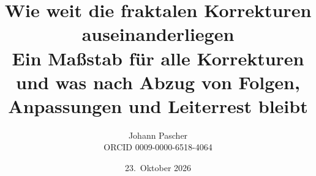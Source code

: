 \documentclass[11pt,a4paper]{report}
\title{Wie weit die fraktalen Korrekturen auseinanderliegen\\[0.5em]
  \large Ein Maßstab für alle Korrekturen und was nach Abzug von Folgen, Anpassungen und Leiterrest bleibt}
\date{23.~Oktober 2026}
\author{Johann Pascher\\\small ORCID 0009-0000-6518-4064}
\begin{document}
\renewcommand{\thechapter}{}
\renewcommand{\thesection}{\arabic{section}}
\maketitle
\tableofcontents

\end{document}
